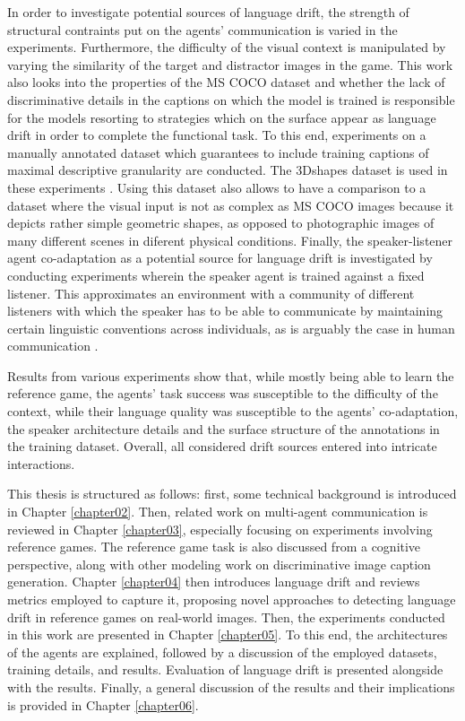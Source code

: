 In order to investigate potential sources of language drift, the strength of structural contraints put on the agents' communication is varied in the experiments. Furthermore, the difficulty of the visual context is manipulated by varying the similarity of the target and distractor images in the game. This work also looks into the properties of the MS COCO dataset and whether the lack of discriminative details in the captions on which the model is trained is responsible for the models resorting to strategies which on the surface appear as language drift in order to complete the functional task. To this end, experiments on a manually annotated dataset which guarantees to include training captions of maximal descriptive granularity are conducted. The 3Dshapes dataset is used in these experiments \parencite{burgess20183d}. Using this dataset also allows to have a comparison to a dataset where the visual input is not as complex as MS COCO images because it depicts rather simple geometric shapes, as opposed to photographic images of many different scenes in diferent physical conditions. Finally, the speaker-listener agent co-adaptation as a potential source for language drift is investigated by conducting experiments wherein the speaker agent is trained against a fixed listener. This approximates an environment with a community of different listeners with which the speaker has to be able to communicate by maintaining certain linguistic conventions across individuals, as is arguably the case in human communication \parencite{kirby2014iterated, clark1991grounding}. 

Results from various experiments show that, while mostly being able to learn the reference game, the agents' task success was susceptible to the difficulty of the context, while their language quality was susceptible to the agents' co-adaptation, the speaker architecture details and the surface structure of the annotations in the training dataset. Overall, all considered drift sources entered into intricate interactions.

This thesis is structured as follows: first, some technical background is introduced in Chapter \ref{chapter02}. Then, related work on multi-agent communication is reviewed in Chapter \ref{chapter03}, especially focusing on experiments involving reference games. The reference game task is also discussed from a cognitive perspective, along with other modeling work on discriminative image caption generation. Chapter \ref{chapter04} then introduces language drift and reviews metrics employed to capture it, proposing novel approaches to detecting language drift in reference games on real-world images. Then, the experiments conducted in this work are presented in Chapter \ref{chapter05}. To this end, the architectures of the agents are explained, followed by a discussion of the employed datasets, training details, and results. Evaluation of language drift is presented alongside with the results. Finally, a general discussion of the results and their implications is provided in Chapter \ref{chapter06}. %

